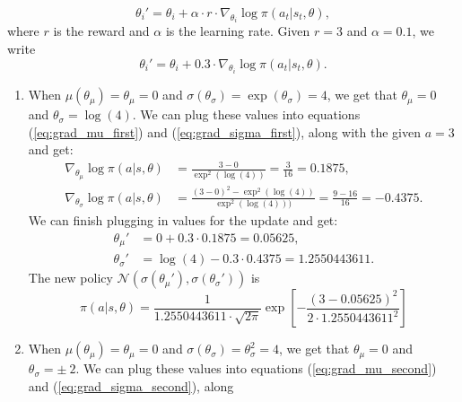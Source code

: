 \documentclass{article}
\begin{document}
\begin{enumerate}
	      \begin{equation}
		      \theta_i'=  \theta_i + \alpha \cdot r \cdot \nabla_{\theta_i} \log \pi(a_t|s_t, \theta),
	      \end{equation}
	      where $r$ is the reward and $\alpha$ is the learning rate. Given $r = 3$ and $\alpha = 0.1$,
	      we write
	      \begin{equation}
		      \theta_i'=  \theta_i + 0.3 \cdot \nabla_{\theta_i} \log \pi(a_t|s_t, \theta).
	      \end{equation}
	      \begin{enumerate}
		      \item When $\mu(\theta_\mu) = \theta_\mu = 0$ and $\sigma(\theta_\sigma)
			            = \exp(\theta_\sigma) = 4$, we get that $\theta_\mu = 0$ and $\theta_\sigma
			            = \log(4)$. We can plug these values into equations (\ref{eq:grad_mu_first}) and
		            (\ref{eq:grad_sigma_first}), along with the given $a=3$ and get:
		            \begin{align*}
			            \nabla_{\theta_\mu} \log \pi(a|s, \theta)    & = \frac{3-0}{\exp^2(\log(4))}
			            = \frac{3}{16} = 0.1875,                                                     \\
			            \nabla_{\theta_\sigma} \log \pi(a|s, \theta) & = \frac{
				            (3-0)^2-\exp^2(\log(4)) }{\exp^2(\log(4)))} = \frac{9 - 16}{16} = -0.4375.
		            \end{align*}
		            We can finish plugging in values for the update and get:
		            \begin{align}
			            \theta_\mu'    & =  0 + 0.3 \cdot 0.1875 = 0.05625,             \\
			            \theta_\sigma' & =  \log(4) - 0.3 \cdot 0.4375 = 1.2550443611.
		            \end{align}
		            The new policy $\mathcal{N}(\sigma(\theta_\mu'), \sigma(\theta_\sigma'))$ is
		            \begin{equation}
			            \pi(a|s, \theta) = \frac{1}{1.2550443611 \cdot \sqrt{2 \pi}}\exp\left[-\frac{(3
					            - 0.05625)^2}{2 \cdot 1.2550443611^2}\right]
		            \end{equation}
		      \item When $\mu(\theta_\mu) = \theta_\mu = 0$ and $\sigma(\theta_\sigma) = \theta_\sigma^2
			            = 4$, we get that $\theta_\mu = 0$ and $\theta_\sigma = \pm ~ 2$. We can plug these
		            values into equations (\ref{eq:grad_mu_second}) and (\ref{eq:grad_sigma_second}), along

\end{enumerate}
\end{enumerate}
\end{document}
